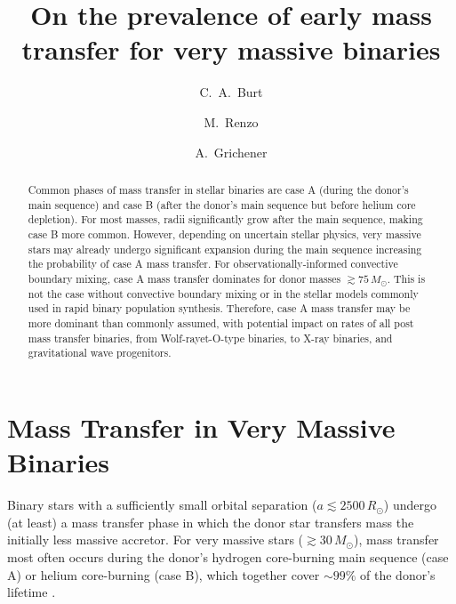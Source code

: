 \documentclass[twocolumn]{aastex63}
\begin{document}
\title{On the prevalence of early mass transfer for very massive binaries}

\author[0009-0008-2061-4946]{C.~A.~Burt}

\author[0000-0002-6718-9472]{M.~Renzo}

\author[0000-0002-2215-1841]{A.~Grichener}

\begin{abstract}
  Common phases of mass transfer in stellar binaries are case A
  (during the donor's main sequence) and case B (after the donor's
  main sequence but before helium core depletion). For most masses,
  radii significantly grow after the main sequence, making case B more
  common. However, depending on uncertain stellar physics, very
  massive stars may already undergo significant expansion during the
  main sequence increasing the probability of case A mass transfer.
  For observationally-informed convective boundary mixing, case A mass
  transfer dominates for donor masses $\gtrsim 75 \, M_{\odot}$. This
  is not the case without convective boundary mixing or in the stellar
  models commonly used in rapid binary population synthesis.
  Therefore, case A mass transfer may be more dominant than commonly
  assumed, with potential impact on rates of all post mass transfer
  binaries, from Wolf-rayet-O-type binaries, to X-ray binaries, and
  gravitational wave progenitors.
\end{abstract}

\section{Mass Transfer in Very Massive Binaries}

Binary stars with a sufficiently small orbital separation
($a\lesssim2500\,R_{\odot}$) undergo (at least) a mass transfer phase
in which the donor star transfers mass the initially less massive
accretor. For very massive stars ($ \gtrsim 30 \, M_{\odot}$), mass
transfer most often occurs during the donor's hydrogen core-burning
main sequence (case A) or helium core-burning (case B), which together cover
$\sim99\%$ of the donor's lifetime \citep{kippenhahn:67}.
\end{document}
